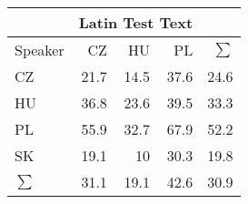 \begin{tabular}{l|rrr|r}
\hline
 & \multicolumn{3}{c}{Latin Test Text} & \\
\hline
 Speaker   &   CZ &   HU &   PL &   $\sum$ \\
\hline
 CZ        & 21.7 & 14.5 & 37.6 &     24.6 \\
 HU        & 36.8 & 23.6 & 39.5 &     33.3 \\
 PL        & 55.9 & 32.7 & 67.9 &     52.2 \\
 SK        & 19.1 & 10   & 30.3 &     19.8 \\
\hline
 $\sum$   & 31.1 & 19.1 & 42.6 &     30.9 \\
\hline
\end{tabular}